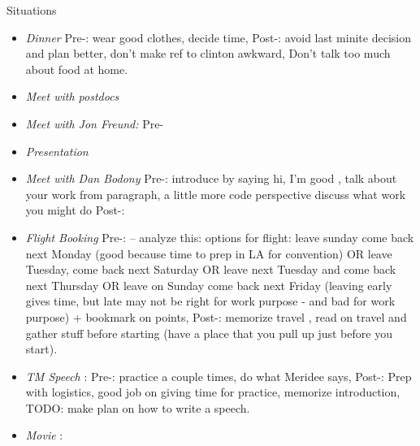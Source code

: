 \documentclass[serif, mathserif, final]{beamer}
\begin{document}
\begin{frame}{}
\begin{columns}
\begin{column}{0.20\linewidth}
\begin{block}{Situations}
\begin{itemize}
              \item \tiny \textit{Dinner} Pre-: wear good clothes,
                decide time, Post-: avoid last minite decision and
                plan better, don't make ref to clinton awkward, Don't
                talk too much about food at home. 
                \item \tiny \textit{Meet with postdocs}
                \item \tiny \textit{Meet with Jon Freund:} Pre- 
                \item \tiny \textit{Presentation} 
                \item \tiny \textit{Meet with Dan Bodony} Pre-:
                  introduce by saying hi, I'm good , talk about your
                  work from paragraph, a little more code perspective 
                  discuss what work you might do  Post-: 

                \item \tiny \textit{Flight Booking} Pre-: -- analyze
                  this: options for
                  flight: leave sunday come back next Monday (good
                  because time to prep in LA for convention) OR leave
                  Tuesday, come back next Saturday OR leave next
                  Tuesday and come back next Thursday OR leave on
                  Sunday come back next Friday (leaving early gives
                  time, but late may not be right for work purpose -
                  and bad for work purpose) + bookmark on points, Post-: memorize travel ,
                  read on travel and gather stuff before starting
                  (have a place that you pull up just before you
                  start). 

                \item \tiny \textit{TM Speech} : Pre-:  practice a
                  couple times, do what Meridee says, Post-: Prep with
                 logistics, good job on giving time for practice,
                 memorize introduction,  TODO: make plan on how to
                 write a speech. 

               \item \tiny \textit{Movie} : 

    \end{itemize}
  \end{block}
\end{column}%
\end{columns}

\end{frame}
\end{document}

